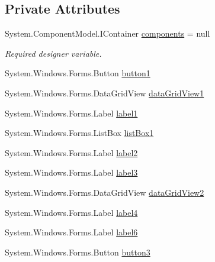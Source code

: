 \subsection*{Private Attributes}
\begin{DoxyCompactItemize}
\item 
System.\+Component\+Model.\+I\+Container \hyperlink{classProject__Codename__Olympia__v1_1_1__0_1_1RegisterEventForm_a8bd8168f91458cee35017fa5e7e500dc}{components} = null
\begin{DoxyCompactList}\small\item\em Required designer variable. \end{DoxyCompactList}\item 
System.\+Windows.\+Forms.\+Button \hyperlink{classProject__Codename__Olympia__v1_1_1__0_1_1RegisterEventForm_aa2ec4b2a01bd5bab8a3f7219a8019eaf}{button1}
\item 
System.\+Windows.\+Forms.\+Data\+Grid\+View \hyperlink{classProject__Codename__Olympia__v1_1_1__0_1_1RegisterEventForm_a9c1c752fd92e8bf4cb9299178f7ac812}{data\+Grid\+View1}
\item 
System.\+Windows.\+Forms.\+Label \hyperlink{classProject__Codename__Olympia__v1_1_1__0_1_1RegisterEventForm_a928c963690ecf1cbb2a54e8e893e3cad}{label1}
\item 
System.\+Windows.\+Forms.\+List\+Box \hyperlink{classProject__Codename__Olympia__v1_1_1__0_1_1RegisterEventForm_a3cd13f11b076aefe4cea70c8ec3f8290}{list\+Box1}
\item 
System.\+Windows.\+Forms.\+Label \hyperlink{classProject__Codename__Olympia__v1_1_1__0_1_1RegisterEventForm_a75ae2d23bc489af001d1f223d3e5cba0}{label2}
\item 
System.\+Windows.\+Forms.\+Label \hyperlink{classProject__Codename__Olympia__v1_1_1__0_1_1RegisterEventForm_a72f66a0ab49961208d93847cd0d5130f}{label3}
\item 
System.\+Windows.\+Forms.\+Data\+Grid\+View \hyperlink{classProject__Codename__Olympia__v1_1_1__0_1_1RegisterEventForm_ae87a8c50a8c6ffeace9dd78082545507}{data\+Grid\+View2}
\item 
System.\+Windows.\+Forms.\+Label \hyperlink{classProject__Codename__Olympia__v1_1_1__0_1_1RegisterEventForm_a999d4d9063ef04a73b856bbe8b149bd5}{label4}
\item 
System.\+Windows.\+Forms.\+Label \hyperlink{classProject__Codename__Olympia__v1_1_1__0_1_1RegisterEventForm_aea31b5b8d3e3455918e36f854b4aa287}{label6}
\item 
System.\+Windows.\+Forms.\+Button \hyperlink{classProject__Codename__Olympia__v1_1_1__0_1_1RegisterEventForm_aa66c209f386035ba4a590691dd8d51e7}{button3}
\end{DoxyCompactItemize}


